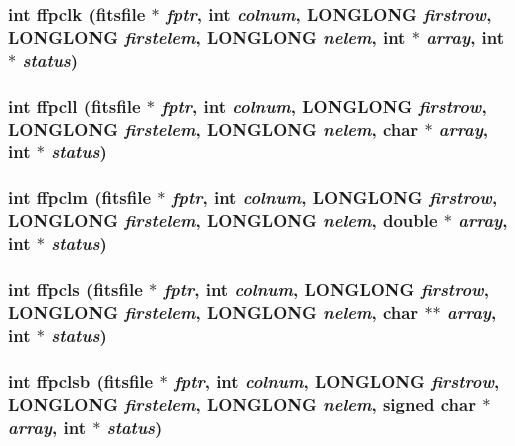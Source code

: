 \subsubsection{\setlength{\rightskip}{0pt plus 5cm}int ffpclk (\bf{fitsfile} $\ast$ {\em fptr}, int {\em colnum}, \bf{LONGLONG} {\em firstrow}, \bf{LONGLONG} {\em firstelem}, \bf{LONGLONG} {\em nelem}, int $\ast$ {\em array}, int $\ast$ {\em status})}\label{src_2fitsio_8h_d4e01a4e0406be50e5e104f31f5c8fea}


\subsubsection{\setlength{\rightskip}{0pt plus 5cm}int ffpcll (\bf{fitsfile} $\ast$ {\em fptr}, int {\em colnum}, \bf{LONGLONG} {\em firstrow}, \bf{LONGLONG} {\em firstelem}, \bf{LONGLONG} {\em nelem}, char $\ast$ {\em array}, int $\ast$ {\em status})}\label{src_2fitsio_8h_353d8ec816b71620a84af201290d5932}


\subsubsection{\setlength{\rightskip}{0pt plus 5cm}int ffpclm (\bf{fitsfile} $\ast$ {\em fptr}, int {\em colnum}, \bf{LONGLONG} {\em firstrow}, \bf{LONGLONG} {\em firstelem}, \bf{LONGLONG} {\em nelem}, double $\ast$ {\em array}, int $\ast$ {\em status})}\label{src_2fitsio_8h_af1f2dc6beaea63dbf91a8be037be940}


\subsubsection{\setlength{\rightskip}{0pt plus 5cm}int ffpcls (\bf{fitsfile} $\ast$ {\em fptr}, int {\em colnum}, \bf{LONGLONG} {\em firstrow}, \bf{LONGLONG} {\em firstelem}, \bf{LONGLONG} {\em nelem}, char $\ast$$\ast$ {\em array}, int $\ast$ {\em status})}\label{src_2fitsio_8h_d58114695cd1281daa17eff622c1e38a}


\subsubsection{\setlength{\rightskip}{0pt plus 5cm}int ffpclsb (\bf{fitsfile} $\ast$ {\em fptr}, int {\em colnum}, \bf{LONGLONG} {\em firstrow}, \bf{LONGLONG} {\em firstelem}, \bf{LONGLONG} {\em nelem}, signed char $\ast$ {\em array}, int $\ast$ {\em status})}\label{src_2fitsio_8h_3c19da60283d0f6c16d2c4508ee2b551}


